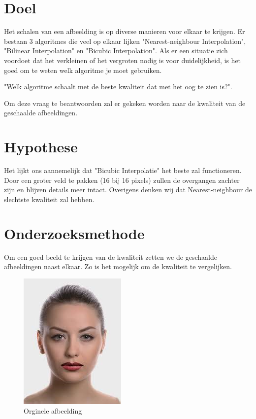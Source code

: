 \documentclass{article}
\begin{document}


\clearpage

\renewcommand{\contentsname}{Inhoudsopgave}
\tableofcontents

\clearpage

\section{Doel}
Het schalen van een afbeelding is op diverse manieren voor elkaar te krijgen. Er bestaan 3 algoritmes die veel op elkaar lijken "Nearest-neighbour Interpolation", "Bilinear Interpolation" en "Bicubic Interpolation". Als er een situatie zich voordoet dat het verkleinen of het vergroten nodig is voor duidelijkheid, is het goed om te weten welk algoritme je moet gebruiken. 

\begin{center}
    "Welk algoritme schaalt met de beste kwaliteit dat met het oog te zien is?".   
\end{center}

Om deze vraag te beantwoorden zal er gekeken worden naar de kwaliteit van de geschaalde afbeeldingen.

\section{Hypothese}

Het lijkt ons aannemelijk dat "Bicubic Interpolatie" het beste zal functioneren. Door een groter veld te pakken (16 bij 16 pixels) zullen de overgangen zachter zijn en blijven details meer intact. Overigens denken wij dat Nearest-neighbour de slechtste kwaliteit zal hebben. 

\section{Onderzoeksmethode}
Om een goed beeld te krijgen van de kwaliteit zetten we de geschaalde afbeeldingen naast elkaar. Zo is het mogelijk om de kwaliteit te vergelijken.

\begin{figure}[H]
    \centering
    \includegraphics{assets/female-3.png}
    \caption{Orginele afbeelding}
    \label{fig:my_label}
\end{figure}
\end{document}
